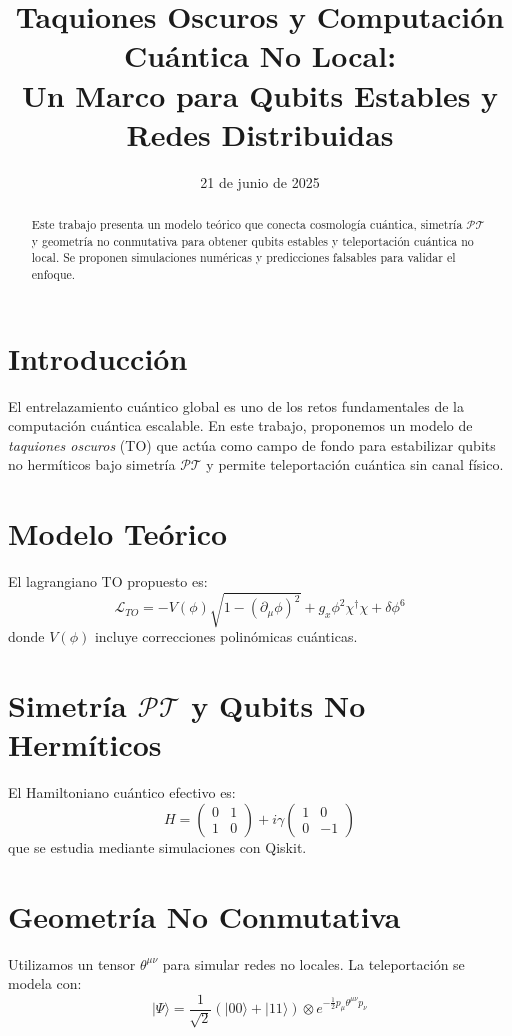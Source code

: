 \documentclass[11pt]{article}
\title{Taquiones Oscuros y Computación Cuántica No Local:\\ Un Marco para Qubits Estables y Redes Distribuidas}
\author{}
\date{21 de junio de 2025}
\begin{document}
\maketitle

\begin{abstract}
Este trabajo presenta un modelo teórico que conecta cosmología cuántica, simetría $\mathcal{PT}$ y geometría no conmutativa para obtener qubits estables y teleportación cuántica no local. Se proponen simulaciones numéricas y predicciones falsables para validar el enfoque.
\end{abstract}

\section{Introducción}
El entrelazamiento cuántico global es uno de los retos fundamentales de la computación cuántica escalable. En este trabajo, proponemos un modelo de \textit{taquiones oscuros} (TO) que actúa como campo de fondo para estabilizar qubits no hermíticos bajo simetría $\mathcal{PT}$ y permite teleportación cuántica sin canal físico.

\section{Modelo Teórico}
El lagrangiano TO propuesto es:
\[
\mathcal{L}_{TO} = -V(\phi) \sqrt{1 - (\partial_\mu \phi)^2} + g_x \phi^2 \chi^\dagger \chi + \delta \phi^6
\]
donde $V(\phi)$ incluye correcciones polinómicas cuánticas.

\section{Simetría $\mathcal{PT}$ y Qubits No Hermíticos}
El Hamiltoniano cuántico efectivo es:
\[
H = \begin{pmatrix} 0 & 1 \\ 1 & 0 \end{pmatrix} + i\gamma \begin{pmatrix} 1 & 0 \\ 0 & -1 \end{pmatrix}
\]
que se estudia mediante simulaciones con Qiskit.

\section{Geometría No Conmutativa}
Utilizamos un tensor $\theta^{\mu\nu}$ para simular redes no locales. La teleportación se modela con:
\[
|\Psi\rangle = \frac{1}{\sqrt{2}}(|00\rangle + |11\rangle) \otimes e^{-\frac{1}{2}p_\mu \theta^{\mu\nu} p_\nu}
\]
\end{document}
